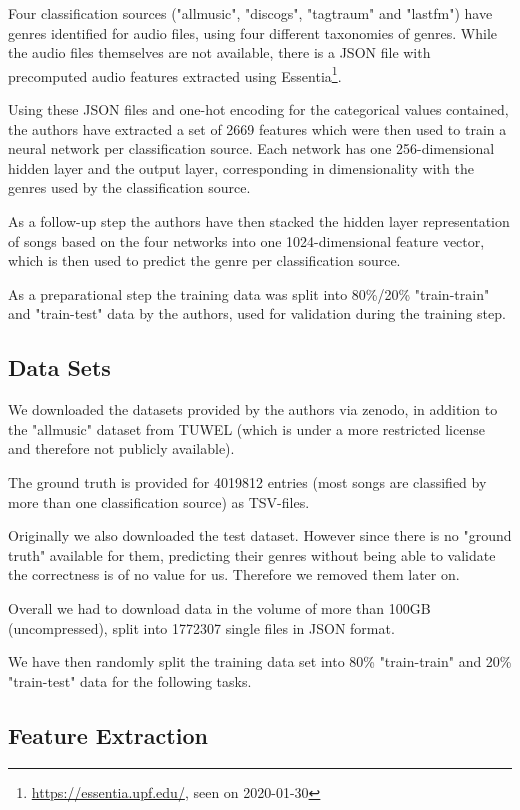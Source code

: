 \documentclass[sigconf,nonacm]{acmart}
\begin{document}
Four classification sources ("allmusic", "discogs", "tagtraum" and "lastfm")
have genres identified for audio files, using four different taxonomies
of genres.
While the audio files themselves are not available, there is a JSON
file with precomputed audio features extracted using 
Essentia\footnote{\url{https://essentia.upf.edu/}, seen on 2020-01-30}.

Using these JSON files and one-hot encoding for the categorical
values contained,
the authors have extracted a set of 2669 features which were
then used to train a neural network per classification source.
Each network has one 256-dimensional hidden layer and the output layer,
corresponding in dimensionality with the genres used by the classification
source. 

As a follow-up step the authors have then stacked the hidden
layer representation of songs based on the four networks into
one 1024-dimensional feature vector, which is then used to predict
the genre per classification source.

As a preparational step the training data was split into 80\%/20\%
"train-train" and "train-test" data by the authors,
used for validation during the training step.

\subsection{Data Sets}

We downloaded the datasets provided by the authors via zenodo,
in addition to the "allmusic" dataset from TUWEL
(which is under a more restricted license and therefore not
publicly available).

The ground truth is provided for 4019812 entries (most songs are
classified by more than one classification source) as TSV-files.

Originally we also downloaded the test dataset.
However since there is no "ground truth" available for them, predicting
their genres without being able to validate the correctness is of
no value for us.
Therefore we removed them later on.

Overall we had to download data in the volume of
more than 100GB (uncompressed),
split into 1772307 single files in JSON format.

We have then randomly split the training data set into 80\%
"train-train" and 20\% "train-test" data for the following tasks.

\subsection{Feature Extraction}
\end{document}
